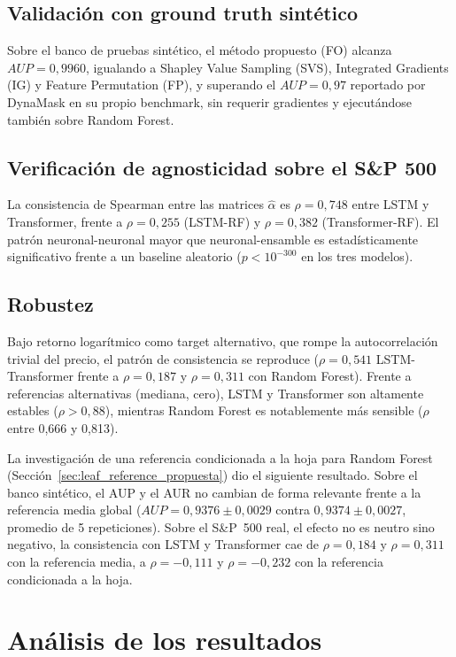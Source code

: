 \subsection{Validación con ground truth sintético}

Sobre el banco de pruebas sintético, el método propuesto (FO) alcanza $AUP=0{,}9960$, igualando a Shapley Value Sampling (SVS), Integrated Gradients (IG) y Feature Permutation (FP), y superando el $AUP=0{,}97$ reportado por DynaMask en su propio benchmark, sin requerir gradientes y ejecutándose también sobre Random Forest.

\subsection{Verificación de agnosticidad sobre el S\&P 500}

La consistencia de Spearman entre las matrices $\hat{\alpha}$ es $\rho=0{,}748$ entre LSTM y Transformer, frente a $\rho=0{,}255$ (LSTM-RF) y $\rho=0{,}382$ (Transformer-RF). El patrón neuronal-neuronal mayor que neuronal-ensamble es estadísticamente significativo frente a un baseline aleatorio ($p<10^{-300}$ en los tres modelos).

\subsection{Robustez}

Bajo retorno logarítmico como target alternativo, que rompe la autocorrelación trivial del precio, el patrón de consistencia se reproduce ($\rho=0{,}541$ LSTM-Transformer frente a $\rho=0{,}187$ y $\rho=0{,}311$ con Random Forest). Frente a referencias alternativas (mediana, cero), LSTM y Transformer son altamente estables ($\rho>0{,}88$), mientras Random Forest es notablemente más sensible ($\rho$ entre 0{,}666 y 0{,}813).

La investigación de una referencia condicionada a la hoja para Random Forest (Sección~\ref{sec:leaf_reference_propuesta}) dio el siguiente resultado. Sobre el banco sintético, el AUP y el AUR no cambian de forma relevante frente a la referencia media global ($AUP=0{,}9376\pm0{,}0029$ contra $0{,}9374\pm0{,}0027$, promedio de 5 repeticiones). Sobre el S\&P~500 real, el efecto no es neutro sino negativo, la consistencia con LSTM y Transformer cae de $\rho=0{,}184$ y $\rho=0{,}311$ con la referencia media, a $\rho=-0{,}111$ y $\rho=-0{,}232$ con la referencia condicionada a la hoja.

\section{Análisis de los resultados}

